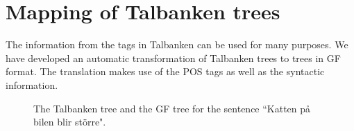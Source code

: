 \documentclass[10pt, a4paper]{article}
\begin{document}
\section{Mapping of Talbanken trees}
\label{sec:mapping}
The information from the tags in Talbanken can be used for many purposes.
We have developed an automatic transformation of Talbanken trees 
to trees in GF format. The translation makes use of the POS tags as well as
the syntactic information. 
\begin{figure}[h!]
\begin{center}
\hspace{-30mm}
\hspace{-10mm}
\caption{The Talbanken tree and the GF tree for the sentence ``Katten p{\aa} bilen blir st{\"o}rre".}
\label{fig:translationtrees}
\end{center}
\end{figure}
\end{document}
